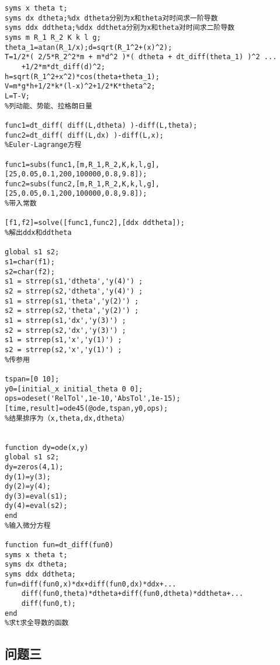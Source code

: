 \documentclass[a4paper,c5size,twoside,UTF8]{ctexart} %
\numberwithin{equation}{section}   %
\begin{document}
\begin{lstlisting}
syms x theta t;
syms dx dtheta;%dx dtheta分别为x和theta对时间求一阶导数
syms ddx ddtheta;%ddx ddtheta分别为x和theta对时间求二阶导数
syms m R_1 R_2 K k l g;
theta_1=atan(R_1/x);d=sqrt(R_1^2+(x)^2);
T=1/2*( 2/5*R_2^2*m + m*d^2 )*( dtheta + dt_diff(theta_1) )^2 ...
    +1/2*m*dt_diff(d)^2;
h=sqrt(R_1^2+x^2)*cos(theta+theta_1);
V=m*g*h+1/2*k*(l-x)^2+1/2*K*theta^2;
L=T-V;
%列动能、势能、拉格朗日量

func1=dt_diff( diff(L,dtheta) )-diff(L,theta);
func2=dt_diff( diff(L,dx) )-diff(L,x);
%Euler-Lagrange方程

func1=subs(func1,[m,R_1,R_2,K,k,l,g],[25,0.05,0.1,200,100000,0.8,9.8]);
func2=subs(func2,[m,R_1,R_2,K,k,l,g],[25,0.05,0.1,200,100000,0.8,9.8]);
%带入常数

[f1,f2]=solve([func1,func2],[ddx ddtheta]);
%解出ddx和ddtheta

global s1 s2;
s1=char(f1);
s2=char(f2);
s1 = strrep(s1,'dtheta','y(4)') ;
s2 = strrep(s2,'dtheta','y(4)') ;
s1 = strrep(s1,'theta','y(2)') ;
s2 = strrep(s2,'theta','y(2)') ;
s1 = strrep(s1,'dx','y(3)') ;
s2 = strrep(s2,'dx','y(3)') ;
s1 = strrep(s1,'x','y(1)') ;
s2 = strrep(s2,'x','y(1)') ;
%传参用

tspan=[0 10];
y0=[initial_x initial_theta 0 0];
ops=odeset('RelTol',1e-10,'AbsTol',1e-15);
[time,result]=ode45(@ode,tspan,y0,ops);
%结果排序为（x,theta,dx,dtheta）


function dy=ode(x,y)
global s1 s2;
dy=zeros(4,1);
dy(1)=y(3);
dy(2)=y(4);
dy(3)=eval(s1);
dy(4)=eval(s2);
end
%输入微分方程

function fun=dt_diff(fun0)
syms x theta t;
syms dx dtheta;
syms ddx ddtheta;
fun=diff(fun0,x)*dx+diff(fun0,dx)*ddx+...
    diff(fun0,theta)*dtheta+diff(fun0,dtheta)*ddtheta+...
    diff(fun0,t);
end
%求t求全导数的函数
\end{lstlisting}




\subsection{问题三}
\end{document}
